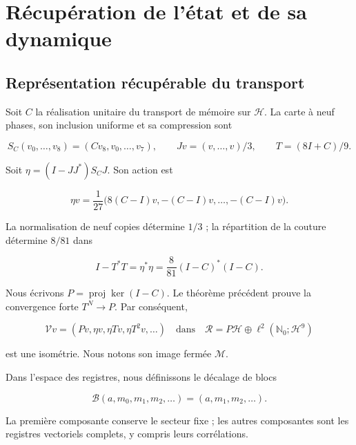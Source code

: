\chapter{Récupération de l’état et de sa dynamique}
\label{x_reciprocidad:nuclear:3}
\section{Représentation récupérable du transport}

Soit \(C\) la réalisation unitaire du transport de mémoire sur \(\mathcal H\). La carte à neuf phases, son inclusion uniforme et sa compression sont

\[
S_C(v_0,\ldots,v_8)=(Cv_8,v_0,\ldots,v_7),\qquad
Jv=(v,\ldots,v)/3,\qquad T=(8I+C)/9.
\]

Soit \(\eta=(I-JJ^*)S_CJ\). Son action est

\[
\eta v=\frac1{27}\bigl(8(C-I)v,-(C-I)v,\ldots,-(C-I)v\bigr).
\]

La normalisation de neuf copies détermine \(1/3\) ; la répartition de la couture détermine \(8/81\) dans

\begin{equation}
I-T^*T=\eta^*\eta=\frac8{81}(I-C)^*(I-C).
\label{x_reciprocidad:nuc03:eq:1}
\end{equation}

Nous écrivons \(P=\operatorname{proj}\ker(I-C)\). Le théorème précédent prouve la convergence forte \(T^N\to P\). Par conséquent,

\begin{equation}
\mathcal Vv=(Pv,\eta v,\eta Tv,\eta T^2v,\ldots)
\quad\text{dans}\quad
\mathcal R=P\mathcal H\oplus\ell^2(\mathbb N_0;\mathcal H^9)
\label{x_reciprocidad:nuc03:eq:2}
\end{equation}

est une isométrie. Nous notons son image fermée \(\mathcal M\).

Dans l’espace des registres, nous définissons le décalage de blocs

\begin{equation}
\mathcal B(a,m_0,m_1,m_2,\ldots)=(a,m_1,m_2,\ldots).
\label{x_reciprocidad:nuc03:eq:3}
\end{equation}

La première composante conserve le secteur fixe ; les autres composantes sont les registres vectoriels complets, y compris leurs corrélations.

